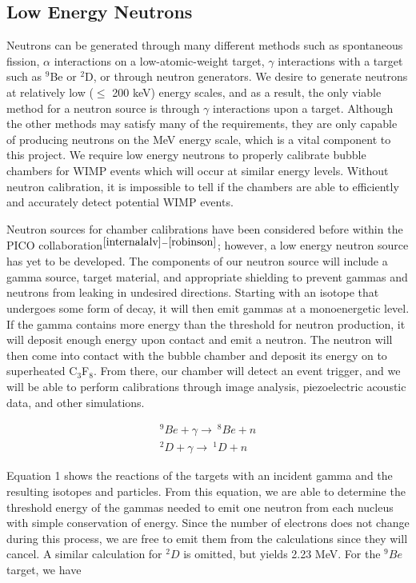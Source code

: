 \documentclass[%
12pt,
twoside,
reprint,
amsmath,amssymb,
aps,
]{article}
\begin{document}
	\subsection{Low Energy Neutrons}
	\par Neutrons can be generated through many different methods such as spontaneous fission, $\alpha$ interactions on a low-atomic-weight target, $\gamma$ interactions with a target such as $^{9}$Be or $^{2}$D, or through neutron generators. We desire to generate neutrons at relatively low ($\leq$ 200 keV) energy scales, and as a result, the only viable method for a neutron source is through $\gamma$ interactions upon a target. Although the other methods may satisfy many of the requirements, they are only capable of producing neutrons on the MeV energy scale, which is a vital component to this project. We require low energy neutrons to properly calibrate bubble chambers for WIMP events which will occur at similar energy levels. Without neutron calibration, it is impossible to tell if the chambers are able to efficiently and accurately detect potential WIMP events.
	\par Neutron sources for chamber calibrations have been considered before within the PICO collaboration$^{\cite{internalalv}-\cite{robinson}}$; however, a low energy neutron source has yet to be developed. The components of our neutron source will include a gamma source, target material, and appropriate shielding to prevent gammas and neutrons from leaking in undesired directions. Starting with an isotope that undergoes some form of decay, it will then emit gammas at a monoenergetic level. If the gamma contains more energy than the threshold for neutron production, it will deposit enough energy upon contact and emit a neutron. The neutron will then come into contact with the bubble chamber and deposit its energy on to superheated C$_{3}$F$_{8}$. From there, our chamber will detect an event trigger, and we will be able to perform calibrations through image analysis, piezoelectric acoustic data, and other simulations.
	
	\begin{equation}
	\begin{aligned}	
	^{9}Be + \gamma \longrightarrow\ ^{8}Be + n \\
	^{2}D + \gamma \longrightarrow\ ^{1}D + n
	\end{aligned}
	\end{equation}
	
	\par Equation 1 shows the reactions of the targets with an incident gamma and the resulting isotopes and particles. From this equation, we are able to determine the threshold energy of the gammas needed to emit one neutron from each nucleus with simple conservation of energy. Since the number of electrons does not change during this process, we are free to emit them from the calculations since they will cancel. A similar calculation for $^{2}D$ is omitted, but yields 2.23 MeV. For the $^{9}Be$ target, we have
	
\end{document}

